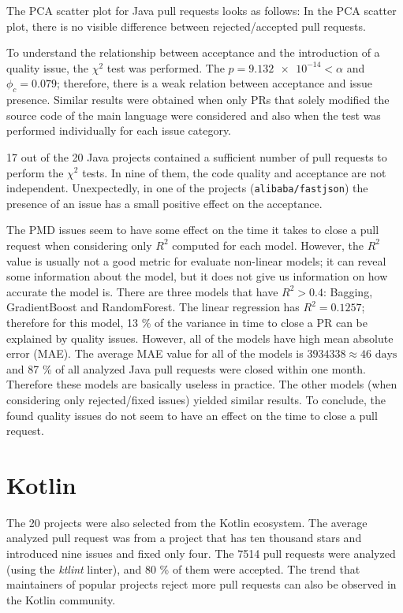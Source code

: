 \documentclass[digital,oneside,oldtable,nolof,nolot,nocover]{fithesis4}
\begin{document}
The PCA scatter plot for Java pull requests looks as follows:
In the PCA scatter plot, there is no visible difference between rejected/accepted pull requests.

To understand the relationship between acceptance and the introduction of a quality issue,
the \(\chi^2\) test was performed.
The \(p = \num{9.132e-14} < \alpha\) and \(\phi_c = 0.079\); therefore, there is
a weak relation between acceptance and issue presence. Similar results were
obtained when only PRs that solely modified the source code of the main language were
considered and also when the test was performed individually for each issue category.

17 out of the 20 Java projects contained a sufficient number of pull requests to
perform the \(\chi^2\) tests. In nine of them, the code quality and acceptance are
not independent. Unexpectedly, in one of the projects (\texttt{alibaba/fastjson}) the
presence of an issue has a small positive effect on the acceptance.

The PMD issues seem to have some effect on the time it takes to close a pull
request when considering only \(R^2\) computed for each model. However, the
\(R^2\) value is usually not a good metric for evaluate non-linear models;
it can reveal some information about the model, but it does not give us
information on how accurate the model is. There are three models that have \(R^2
   > 0.4\): Bagging, GradientBoost and RandomForest.  The linear regression has
\(R^2 = 0.1257\); therefore for this model, 13 \% of the variance in time to close a
PR can be explained by quality issues. However, all of the models have high mean
absolute error (MAE). The average MAE value for all of the models is \(3934338
   \approx 46\text{ days}\) and 87 \% of all analyzed Java pull requests were
closed within one month. Therefore these models are basically useless in
practice. The other models (when considering only rejected/fixed issues) yielded
similar results. To conclude, the found quality issues do not seem to have an
effect on the time to close a pull request.
\section{Kotlin}
\label{sec:org7ba855e}
The 20 projects were also selected from the Kotlin ecosystem.
The average analyzed pull request was from a project that has ten thousand
stars and introduced nine issues and fixed only four. The 7514 pull requests
were analyzed (using the \emph{ktlint} linter), and 80 \% of them were accepted.
The trend that maintainers of popular projects reject more pull requests can
also be observed in the Kotlin community.
\end{document}
